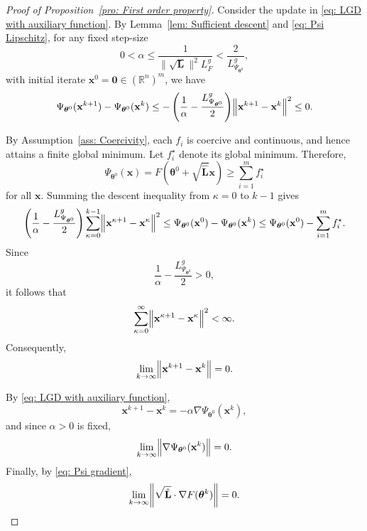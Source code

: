 \documentclass{siamart251216}
\begin{document}
\begin{proof}[Proof of Proposition~\ref{pro: First order property}]
    Consider the update in \eqref{eq: LGD with auxiliary function}.
    By Lemma~\ref{lem: Sufficient descent} and
    \eqref{eq: Psi Lipschitz}, for any fixed step-size
    \[
        0 < \alpha
        \le
        \frac{1}
        {\|\sqrt{\mathbf{L}}\|^{2} L_{F}^{g}}
        <
        \frac{2}{L_{\Psi_{\boldsymbol{\theta}^{0}}}^{g}},
    \]
    with initial iterate
    $\mathbf{x}^{0}=\bm{0}\in(\mathbb{R}^{n})^{m}$, we have
    \[
        \Psi_{\boldsymbol{\theta}^{0}}(\mathbf{x}^{k+1})
        -
        \Psi_{\boldsymbol{\theta}^{0}}(\mathbf{x}^{k})
        \le
        -
        \left(
        \frac{1}{\alpha}
        -
        \frac{L_{\Psi_{\boldsymbol{\theta}^{0}}}^{g}}{2}
        \right)
        \norm{\mathbf{x}^{k+1}-\mathbf{x}^{k}}^{2}
        \le 0.
    \]

    By Assumption~\ref{ass: Coercivity}, each $f_i$ is coercive
    and continuous, and hence attains a finite global minimum.
    Let $f_i^\star$ denote its global minimum. Therefore,
    \[
        \Psi_{\boldsymbol{\theta}^{0}}(\mathbf{x})
        =
        F\!\left(
        \boldsymbol{\theta}^{0}
        +
        \sqrt{\hat{\mathbf{L}}}\mathbf{x}
        \right)
        \ge
        \sum_{i=1}^{m} f_i^\star
    \]
    for all $\mathbf{x}$. Summing the descent inequality from $\kappa=0$ to $k-1$ gives
    \[
        \left(
        \frac{1}{\alpha}
        -
        \frac{L_{\Psi_{\boldsymbol{\theta}^{0}}}^{g}}{2}
        \right)
        \sum_{\kappa=0}^{k-1}
        \norm{\mathbf{x}^{\kappa+1}-\mathbf{x}^{\kappa}}^{2}
        \le
        \Psi_{\boldsymbol{\theta}^{0}}(\mathbf{x}^{0})
        -
        \Psi_{\boldsymbol{\theta}^{0}}(\mathbf{x}^{k})
        \le
        \Psi_{\boldsymbol{\theta}^{0}}(\mathbf{x}^{0})
        -
        \sum_{i=1}^{m} f_i^\star .
    \]
    Since
    \[
        \frac{1}{\alpha}
        -
        \frac{L_{\Psi_{\boldsymbol{\theta}^{0}}}^{g}}{2}
        >0,
    \]
    it follows that
    \[
        \sum_{\kappa=0}^{\infty}
        \norm{\mathbf{x}^{\kappa+1}-\mathbf{x}^{\kappa}}^{2}
        <\infty.
    \]
    Consequently,
    \[
        \lim_{k\to\infty}
        \norm{\mathbf{x}^{k+1}-\mathbf{x}^{k}}
        =0.
    \]

    By \eqref{eq: LGD with auxiliary function},
    \[
        \mathbf{x}^{k+1}-\mathbf{x}^{k}
        =
        -\alpha
        \nabla
        \Psi_{\boldsymbol{\theta}^{0}}(\mathbf{x}^{k}),
    \]
    and since $\alpha>0$ is fixed,
    \[
        \lim_{k\to\infty}
        \norm{
        \nabla
        \Psi_{\boldsymbol{\theta}^{0}}(\mathbf{x}^{k})
        }
        =0.
    \]
    Finally, by \eqref{eq: Psi gradient},
    \[
        \lim_{k\to\infty}
        \norm{
        \sqrt{\hat{\mathbf{L}}}
        \cdot \nabla F(\boldsymbol{\theta}^{k})
        }
        =0.
    \]


\end{proof}
\end{document}
